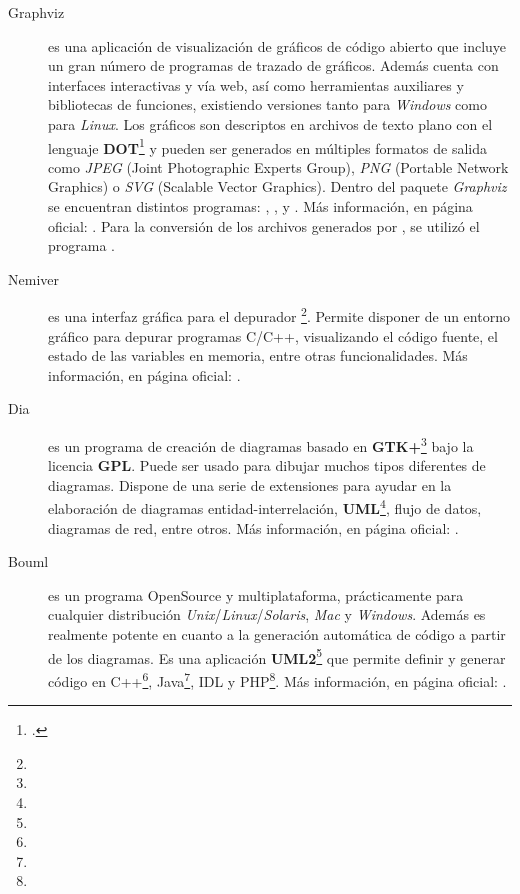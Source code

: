 \begin{description}
\item [Graphviz] es una aplicación de visualización de gráficos de código abierto que incluye un gran número de programas de trazado de gráficos. Además cuenta con interfaces interactivas y vía web, así como herramientas auxiliares y bibliotecas de funciones, existiendo versiones tanto para \textit{Windows} como para \textit{Linux}. Los gráficos son descriptos en archivos de texto plano con el lenguaje \textbf{DOT}\footnote{.} y pueden ser generados en múltiples formatos de salida como \textit{JPEG} (Joint Photographic Experts Group), \textit{PNG} (Portable Network Graphics) o \textit{SVG} (Scalable Vector Graphics). Dentro del paquete \textit{Graphviz} se encuentran distintos programas: , ,  y . Más información, en página oficial: .
Para la conversión de los archivos generados por \maggen, se utilizó el programa .

\item [Nemiver] es una interfaz gráfica para el depurador \footnote{}. Permite disponer de un entorno gráfico para depurar programas C/C++, visualizando el código fuente, el estado de las variables en memoria, entre otras funcionalidades. Más información, en página oficial: .

\item [Dia] es un programa de creación de diagramas basado en \textbf{GTK+}\footnote{} bajo la licencia \textbf{GPL}. Puede ser usado para dibujar muchos tipos diferentes de diagramas. Dispone de una serie de extensiones para ayudar en la elaboración de diagramas entidad-interrelación, \textbf{UML}\footnote{}, flujo de datos, diagramas de red, entre otros. Más información, en página oficial: .

\item[Bouml] es un programa OpenSource y multiplataforma, prácticamente para cualquier distribución \textit{Unix}/\textit{Linux}/\textit{Solaris}, \textit{Mac} y \textit{Windows}. Además es realmente potente en cuanto a la generación automática de código a partir de los diagramas. Es una aplicación \textbf{UML2}\footnote{} que permite definir y generar código en C++\footnote{}, Java\footnote{}, IDL y PHP\footnote{}. Más información, en página oficial: .


\end{description}
